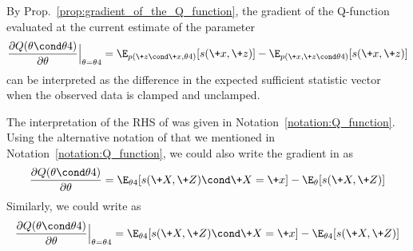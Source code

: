 \documentclass{article} %
\newcommand{\sufficientStatsFunction}{s}
\newcommand{\param}{\theta}
\begin{document}
\begin{corollary}
By Prop.~\ref{prop:gradient_of_the_Q_function}, the gradient of the Q-function evaluated at the current estimate of the parameter
%
\begin{align}
\frac{\partial Q(\param \cond \param^^t)}{\partial \param} \Bigr|_{\param = \param^^t} =  \E_{p(\+z \cond \+x, \param^^t)}[\sufficientStatsFunction(\+x,\+z)] - 	\E_{p(\+x, \+z \cond \param^^t)}[\sufficientStatsFunction(\+x,\+z)] 
\label{eqn:gradient_of_Q_function_as_difference_in_expected_sufficient_stats_with_clamped_and_unclamped_data}
\end{align}
%
can be interpreted as the difference in the expected sufficient statistic vector when the observed data is clamped and unclamped.
\end{corollary}



\begin{notation}
The interpretation of the RHS of  was given in Notation~\ref{notation:Q_function}.     Using the alternative notation of \citet{miller2011why} that we mentioned in Notation~\ref{notation:Q_function}, we could also write the gradient in  as 
 \begin{align}
 \frac{\partial Q(\param \cond \param^^t)}{\partial \param} =  \E_{\param^^t}[\sufficientStatsFunction(\+X,\+Z) \cond \+X=\+x] - 	\E_{\param}[\sufficientStatsFunction(\+X,\+Z)]
 \label{eqn:gradient_of_Q_function_for_EM_in_jeff_millers_notation}
 \end{align}
 Similarly, we could write  as
 \begin{align}
 \frac{\partial Q(\param \cond \param^^t)}{\partial \param} \Bigr|_{\param = \param^^t} =  \E_{\param^^t}[\sufficientStatsFunction(\+X,\+Z) \cond \+X=\+x] - 	\E_{\param^^t}[\sufficientStatsFunction(\+X,\+Z)]
 \label{eqn:the_gradient_of_the_Q_function_evaluated_at_the_current_parameter_and_using_jeffs_notation}
 \end{align}
\end{notation}

\end{document}
